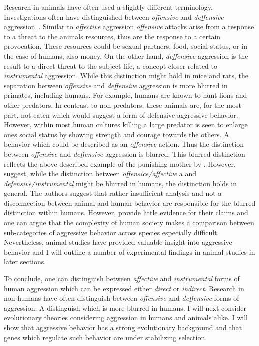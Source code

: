 Research in animals have often used a slightly different terminology.
Investigations often have distinguished between \textit{offensive} and \textit{deffensive} aggression~\cite{Blanchard2005b}.
Similar to \textit{affective} aggression \textit{offensive} attacks arise from a response to a threat to the animals resources, thus are the response to a certain provocation.
These resources could be sexual partners, food, social status, or in the case of humans, also money.
On the other hand, \textit{deffensive} aggression is the result to a direct threat to the subject life, a concept closer related to \textit{instrumental} aggression.
While this distinction might hold in mice and rats, the separation between \textit{offensive} and \textit{deffensive} aggression is more blurred in primates, including humans.
For example, humans are known to hunt lions and other predators.
In contrast to non-predators, these animals are, for the most part, not eaten which would suggest a form of defensive aggressive behavior.
However, within most human cultures killing a large predator is seen to enlarge ones social status by showing strength and courage towards the others.
A behavior which could be described as an \textit{offensive} action.
Thus the distinction between \textit{offensive} and \textit{deffensive} aggression is blurred.
This blurred distinction reflects the above described example of the punishing mother by \citet{Geen2001}.
However, \citet{Blanchard2005b} suggest, while the distinction between \textit{offensice/affective} a and \textit{defensive/instrumental} might be blurred in humans, the distinction holds in general.
The authors suggest that rather insufficient analysis and not a disconnection between animal and human behavior are responsible for the blurred distinction within humans.
However, \citet{Blanchard2005b} provide little evidence for their claims and one can argue that the complexity of human society makes a comparison between sub-categories of aggressive behavior across species especially difficult. 
Nevertheless, animal studies have provided valuable insight into aggressive behavior and I will outline a number of experimental findings in animal studies in later sections.

To conclude, one can distinguish between \textit{affective} and \textit{instrumental} forms of human aggression which can be expressed either \textit{direct} or \textit{indirect}.
Research in non-humans have often distinguish between \textit{offensive} and \textit{deffensive} forms of aggression.
A distinguish which is more blurred in humans.
I will next consider evolutionary theories considering aggression in humans and animals alike.
I will show that aggressive behavior has a strong evolutionary background and that genes which regulate such behavior are under stabilizing selection.

